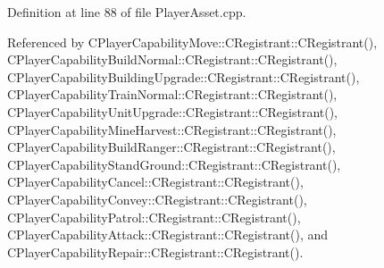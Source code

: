 Definition at line 88 of file Player\+Asset.\+cpp.



Referenced by C\+Player\+Capability\+Move\+::\+C\+Registrant\+::\+C\+Registrant(), C\+Player\+Capability\+Build\+Normal\+::\+C\+Registrant\+::\+C\+Registrant(), C\+Player\+Capability\+Building\+Upgrade\+::\+C\+Registrant\+::\+C\+Registrant(), C\+Player\+Capability\+Train\+Normal\+::\+C\+Registrant\+::\+C\+Registrant(), C\+Player\+Capability\+Unit\+Upgrade\+::\+C\+Registrant\+::\+C\+Registrant(), C\+Player\+Capability\+Mine\+Harvest\+::\+C\+Registrant\+::\+C\+Registrant(), C\+Player\+Capability\+Build\+Ranger\+::\+C\+Registrant\+::\+C\+Registrant(), C\+Player\+Capability\+Stand\+Ground\+::\+C\+Registrant\+::\+C\+Registrant(), C\+Player\+Capability\+Cancel\+::\+C\+Registrant\+::\+C\+Registrant(), C\+Player\+Capability\+Convey\+::\+C\+Registrant\+::\+C\+Registrant(), C\+Player\+Capability\+Patrol\+::\+C\+Registrant\+::\+C\+Registrant(), C\+Player\+Capability\+Attack\+::\+C\+Registrant\+::\+C\+Registrant(), and C\+Player\+Capability\+Repair\+::\+C\+Registrant\+::\+C\+Registrant().


